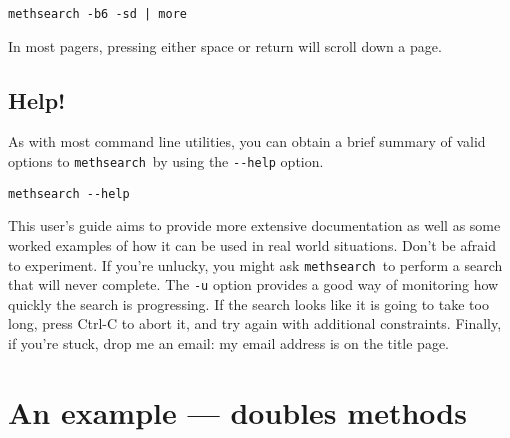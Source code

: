 \documentclass[a4paper,11pt,oneside]{book}
\makeatletter
\newcommand{\loi}[1]{\index{#1@{\hspace*{-\loptwidth}\texttt{--#1}}}}
\def\methsearch{\texttt{meth\-search}}
\makeatother
\begin{document}
\begin{Verbatim}
methsearch -b6 -sd | more
\end{Verbatim}

In most pagers, pressing either space or return will scroll down a page.

\subsection{Help!}\label{help}

As with most command line utilities, you can obtain a brief summary 
of valid options to \methsearch\ by using the \verb+--help+ option.%

\begin{Verbatim}
methsearch --help
\end{Verbatim}
\loi{help}

This user's guide aims to provide more extensive documentation as 
well as some worked examples of how it can be used in real world situations.
Don't be afraid to experiment.  If you're unlucky, you might
ask \methsearch\ to perform a search that will never complete.  
The \verb+-u+ option provides a good way of monitoring how quickly 
the search is progressing.  If the search looks like it is going to take
too long, press Ctrl-C to abort it, and try again with additional constraints.
Finally, if you're stuck, drop me an email:
my email address is on the title page.

\section{An example — doubles methods}\label{eg_doubles}
\end{document}
